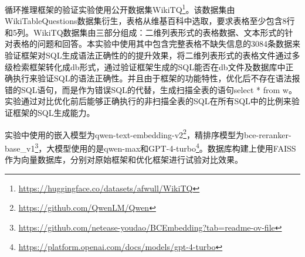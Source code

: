 循环推理框架的验证实验使用公开数据集WikiTQ\footnote[1]{\url{https://huggingface.co/datasets/afwull/WikiTQ}}。该数据集由WikiTableQuestions\cite{pasupat2015compositional}数据集衍生，表格从维基百科中选取，要求表格至少包含8行和5列。WikiTQ数据集由三部分组成：二维列表形式的表格数据、文本形式的针对表格的问题和回答。本实验中使用其中包含完整表格不缺失信息的3084条数据来验证框架对SQL生成语法正确性的的提升效果，将二维列表形式的表格文件通过多级检索框架转化成db形式，通过验证框架生成的SQL能否在db文件及数据库中正确执行来验证SQL的语法正确性。并且由于框架的功能特性，优化后不存在语法报错的SQL语句，而是作为错误SQL的代替，生成扫描全表的语句select * from w。实验通过对比优化前后能够正确执行的非扫描全表的SQL在所有SQL中的比例来验证框架的SQL生成能力。

实验中使用的嵌入模型为qwen-text-embedding-v2\footnote[2]{\url{https://github.com/QwenLM/Qwen}}，精排序模型为bce-reranker-base\_v1\footnote[1]{\url{https://github.com/netease-youdao/BCEmbedding?tab=readme-ov-file}}，大模型使用的是qwen-max和GPT-4-turbo\footnote[2]{\url{https://platform.openai.com/docs/models/gpt-4-turbo}}。数据库构建上使用FAISS作为向量数据库，分别对原始框架和优化框架进行试验对比效果。





